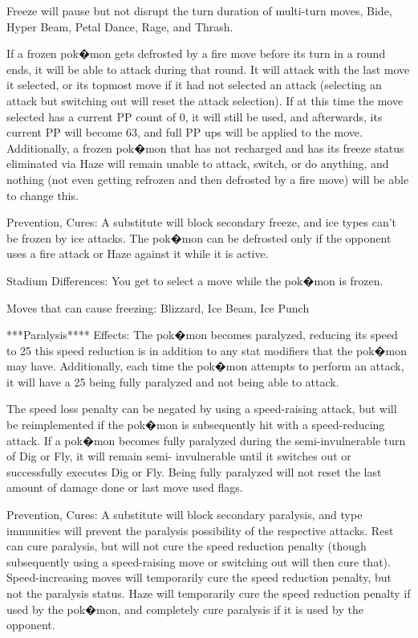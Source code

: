 \documentclass[reprint, aps, prl, paper=A4]{revtex4-1}
\begin{document}
Freeze will pause but not disrupt the turn duration of multi-turn moves, Bide, Hyper Beam,
Petal Dance, Rage, and Thrash.

If a frozen pok�mon gets defrosted by a fire move before its turn in a round ends, it will be
able to attack during that round. It will attack with the last move it selected, or its topmost
move if it had not selected an attack (selecting an attack but switching out will reset the
attack selection). If at this time the move selected has a current PP count of 0, it will still
be used, and afterwards, its current PP will become 63, and full PP ups will be applied to the
move. Additionally, a frozen pok�mon that has not recharged and has its freeze status
eliminated via Haze will remain unable to attack, switch, or do anything, and nothing (not even
getting refrozen and then defrosted by a fire move) will be able to change this.

Prevention, Cures: A substitute will block secondary freeze, and ice types can't be frozen by
ice attacks. The pok�mon can be defrosted only if the opponent uses a fire attack or Haze
against it while it is active.

Stadium Differences: You get to select a move while the pok�mon is frozen.

Moves that can cause freezing: Blizzard, Ice Beam, Ice Punch


***Paralysis****
Effects: The pok�mon becomes paralyzed, reducing its speed to 25%
this speed reduction is in addition to any stat modifiers that the pok�mon may have.
Additionally, each time the pok�mon attempts to perform an attack, it will have a 25%
being fully paralyzed and not being able to attack.

The speed loss penalty can be negated by using a speed-raising attack, but will be
reimplemented if the pok�mon is subsequently hit with a speed-reducing attack. If a pok�mon
becomes fully paralyzed during the semi-invulnerable turn of Dig or Fly, it will remain semi-
invulnerable until it switches out or successfully executes Dig or Fly. Being fully paralyzed
will not reset the last amount of damage done or last move used flags.

Prevention, Cures: A substitute will block secondary paralysis, and type immunities will
prevent the paralysis possibility of the respective attacks. Rest can cure paralysis, but will
not cure the speed reduction penalty (though subsequently using a speed-raising move or
switching out will then cure that). Speed-increasing moves will temporarily cure the speed
reduction penalty, but not the paralysis status. Haze will temporarily cure the speed reduction
penalty if used by the pok�mon, and completely cure paralysis if it is used by the opponent.
\end{document}
